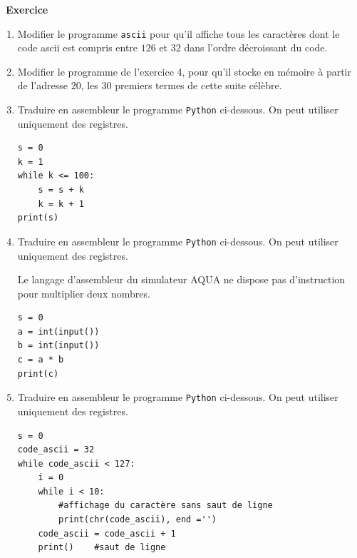 \documentclass[a4paper, french, 11pt]{article}  %
\newcounter{exercice}
\newenvironment{exercice}[1]
{\par \medskip   \addtocounter{exercice}{1} \noindent  
\begin{bclogo}[arrondi =0.1,   noborder = true, logo=\bccrayon, marge=4]{~\textbf{Exercice} \textbf{\theexercice} {\itshape #1} }  \par}
{
\end{bclogo}
 \par \bigskip }
\newcounter{prog}
\begin{document}
\begin{exercice}{}

\begin{enumerate}
	\item Modifier le programme \texttt{ascii} pour qu'il affiche tous les caractères dont le code ascii est compris entre $126$ et $32$ dans l'ordre décroissant du code.
	
	\item Modifier le programme de l'exercice 4, pour qu'il stocke en mémoire à partir de l'adresse $20$, les $30$ premiers termes de cette suite célèbre.
	
	\item Traduire en assembleur le programme \texttt{Python} ci-dessous. On peut utiliser uniquement des registres.
	
\begin{lstlisting}[style=rond]
s = 0
k = 1
while k <= 100:
	s = s + k
	k = k + 1
print(s)
\end{lstlisting}

	\item Traduire en assembleur le programme \texttt{Python} ci-dessous. On peut utiliser uniquement des registres.

\bcattention{} Le langage d'assembleur du simulateur AQUA ne dispose pas d'instruction pour multiplier deux nombres.

 
\begin{lstlisting}[style=rond]s = 0
a = int(input())
b = int(input())
c = a * b
print(c)
\end{lstlisting}


\item Traduire en assembleur le programme \texttt{Python} ci-dessous. On peut utiliser uniquement des registres.

\begin{lstlisting}[style=rond]s = 0
code_ascii = 32
while code_ascii < 127:
	i = 0
	while i < 10:
		#affichage du caractère sans saut de ligne
		print(chr(code_ascii), end ='') 
    code_ascii = code_ascii + 1
	print()    #saut de ligne
\end{lstlisting}

\end{enumerate}

\end{exercice}
\end{document}
